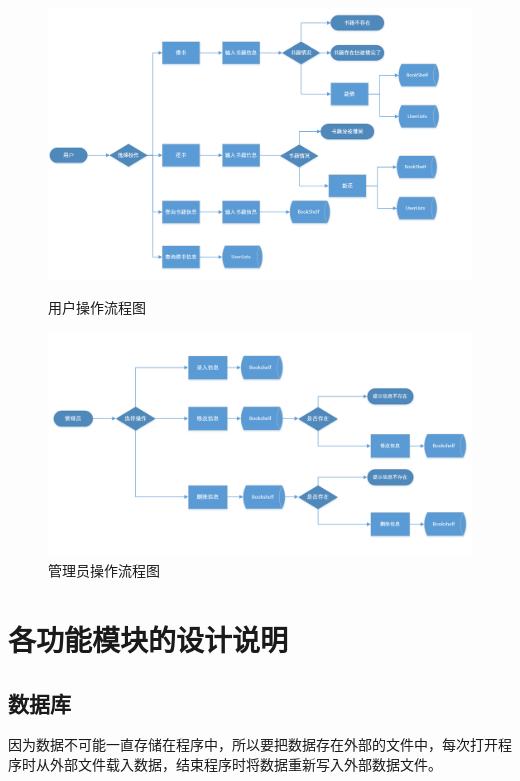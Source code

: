 \documentclass{ctexart}
\begin{document}
    \begin{figure}[h]
        \begin{minipage}[t]{0.5\linewidth}
            \centering
            \includegraphics[width=\linewidth]{src/user.png}
            \caption{用户操作流程图}
        \end{minipage}%
        \begin{minipage}[t]{0.5\linewidth}
            \centering
            \includegraphics[width=\linewidth]{src/admin.png}
            \caption{管理员操作流程图}
        \end{minipage}
    \end{figure}
    
    
    \section{各功能模块的设计说明}
    \subsection{数据库}
    因为数据不可能一直存储在程序中，所以要把数据存在外部的文件中，每次打开程序时从外部文件载入数据，结束程序时将数据重新写入外部数据文件。
    
\end{document}
